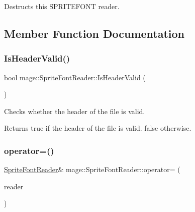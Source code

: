 Destructs this S\+P\+R\+I\+T\+E\+F\+O\+NT reader. 

\subsection{Member Function Documentation}
\hypertarget{classmage_1_1_sprite_font_reader_aa6dd3fc28e531d6db6ecda6ce3535d4c}{}\label{classmage_1_1_sprite_font_reader_aa6dd3fc28e531d6db6ecda6ce3535d4c} 
\subsubsection{\texorpdfstring{Is\+Header\+Valid()}{IsHeaderValid()}}
{\footnotesize\ttfamily bool mage\+::\+Sprite\+Font\+Reader\+::\+Is\+Header\+Valid (\begin{DoxyParamCaption}{ }\end{DoxyParamCaption})\hspace{0.3cm}{\ttfamily [private]}}

Checks whether the header of the file is valid.

\begin{DoxyReturn}{Returns}
{\ttfamily true} if the header of the file is valid. {\ttfamily false} otherwise. 
\end{DoxyReturn}
\hypertarget{classmage_1_1_sprite_font_reader_a4de55b4bebfabb5f1c32078864baef11}{}\label{classmage_1_1_sprite_font_reader_a4de55b4bebfabb5f1c32078864baef11} 
\subsubsection{\texorpdfstring{operator=()}{operator=()}\hspace{0.1cm}{\footnotesize\ttfamily [1/2]}}
{\footnotesize\ttfamily \hyperlink{classmage_1_1_sprite_font_reader}{Sprite\+Font\+Reader}\& mage\+::\+Sprite\+Font\+Reader\+::operator= (\begin{DoxyParamCaption}\item[{const \hyperlink{classmage_1_1_sprite_font_reader}{Sprite\+Font\+Reader} \&}]{reader }\end{DoxyParamCaption})\hspace{0.3cm}{\ttfamily [delete]}}

